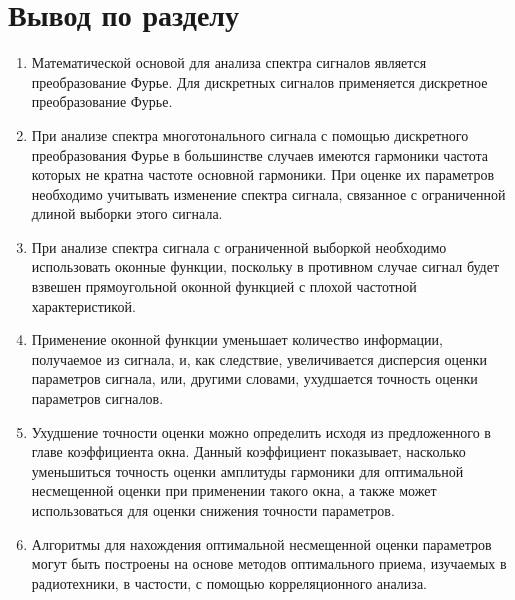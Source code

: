 \section{Вывод по разделу} \label{sec:ch2/sec5}
\begin{enumerate}
\item  Математической основой для анализа спектра сигналов является преобразование Фурье. Для дискретных сигналов применяется дискретное преобразование Фурье.

\item  При анализе спектра многотонального сигнала с помощью дискретного преобразования Фурье в большинстве случаев имеются гармоники частота которых не кратна частоте основной гармоники. При оценке их параметров необходимо учитывать изменение спектра сигнала, связанное с ограниченной длиной выборки этого сигнала.

\item  При анализе спектра сигнала с ограниченной выборкой необходимо использовать оконные функции, поскольку в противном случае сигнал будет взвешен прямоугольной оконной функцией с плохой частотной характеристикой.

\item  Применение оконной функции уменьшает количество информации, получаемое из сигнала, и, как следствие, увеличивается дисперсия оценки параметров сигнала, или, другими словами, ухудшается точность оценки параметров сигналов.

\item  Ухудшение точности оценки можно определить исходя из предложенного в главе коэффициента окна. Данный коэффициент показывает, насколько уменьшиться точность оценки амплитуды гармоники для оптимальной несмещенной оценки при применении такого окна, а также может использоваться для оценки снижения точности параметров.

\item   Алгоритмы для нахождения оптимальной несмещенной оценки параметров могут быть построены на основе методов оптимального приема, изучаемых в радиотехники, в частости, с помощью корреляционного анализа.
\end{enumerate}


